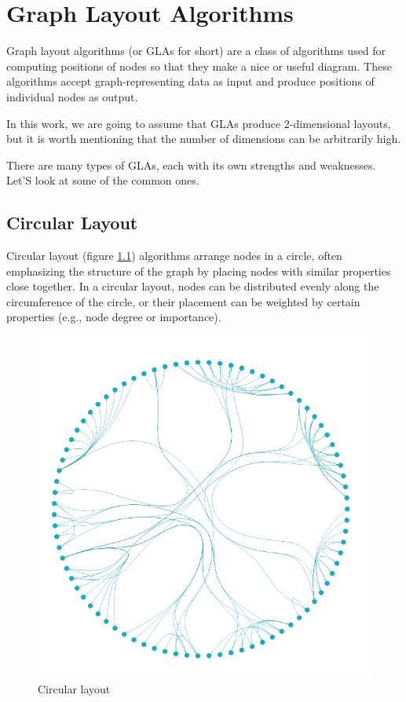 \chapter{Graph Layout Algorithms}

Graph layout algorithms (or GLAs for short) are a class of algorithms used for computing positions
of nodes so that they make a nice or useful diagram.
These algorithms accept graph-representing data as input and produce positions of individual nodes as output.

In this work, we are going to assume that GLAs produce 2-dimensional layouts,
but it is worth mentioning that the number of dimensions can be arbitrarily high.

There are many types of GLAs, each with its own strengths and weaknesses. Let'S look at some of the common ones.

\section{Circular Layout}

Circular layout (figure \ref{obr:graph_layout_circular}) algorithms arrange nodes in a circle, often emphasizing the structure of the graph by placing nodes
with similar properties close together.
In a circular layout, nodes can be distributed evenly along the circumference of the circle,
or their placement can be weighted by certain properties (e.g., node degree or importance).

\begin{figure}[p]\centering
    \includegraphics[width=140mm, keepaspectratio]{img/graph_layout_cicrular.png}
    \caption{Circular layout\cite{graph_layout_demos}}
    \label{obr:graph_layout_circular}
\end{figure}

